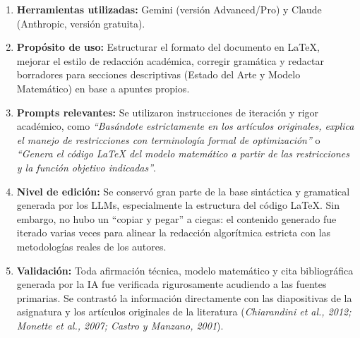 \documentclass[letter, 10pt]{article}
\begin{document}
\begin{enumerate}
    \item \textbf{Herramientas utilizadas:} Gemini (versi\'on Advanced/Pro) y Claude (Anthropic, versi\'on gratuita).
    
    \item \textbf{Prop\'osito de uso:} Estructurar el formato del documento en LaTeX, mejorar el estilo de redacci\'on acad\'emica, corregir gram\'atica y redactar borradores para secciones descriptivas (Estado del Arte y Modelo Matem\'atico) en base a apuntes propios.
    
    \item \textbf{Prompts relevantes:} Se utilizaron instrucciones de iteraci\'on y rigor acad\'emico, como \textit{``Bas\'andote estrictamente en los art\'iculos originales, explica el manejo de restricciones con terminolog\'ia formal de optimizaci\'on''} o \textit{``Genera el c\'odigo LaTeX del modelo matem\'atico a partir de las restricciones y la funci\'on objetivo indicadas''}.

    \item \textbf{Nivel de edici\'on:} Se conserv\'o gran parte de la base sint\'actica y gramatical generada por los LLMs, especialmente la estructura del c\'odigo LaTeX. Sin embargo, no hubo un ``copiar y pegar'' a ciegas: el contenido generado fue iterado varias veces para alinear la redacci\'on algor\'itmica estricta con las metodolog\'ias reales de los autores.
    
    \item \textbf{Validaci\'on:} Toda afirmaci\'on t\'ecnica, modelo matem\'atico y cita bibliogr\'afica generada por la IA fue verificada rigurosamente acudiendo a las fuentes primarias. Se contrast\'o la informaci\'on directamente con las diapositivas de la asignatura y los art\'iculos originales de la literatura (\textit{Chiarandini et al., 2012; Monette et al., 2007; Castro y Manzano, 2001}).
\end{enumerate}


\end{document}
